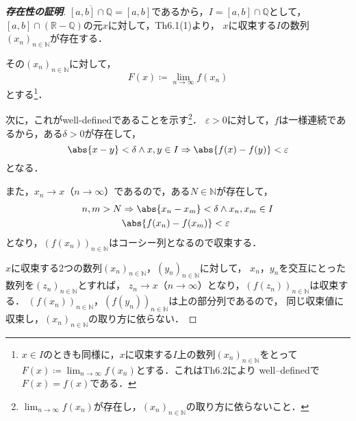 \documentclass[a4paper,10pt,fleqn]{ltjsarticle}
\begin{document}
    \begin{tleftbar}
        \begin{proof}[\textup{\textbf{存在性の証明}}]
            $\overline{[a,b] \cap \mathbb{Q}}=[a,b]$であるから，$I=[a,b] \cap \mathbb{Q}$として，
            $[a,b] \cap (\mathbb{R}-\mathbb{Q})$の元$x$に対して，Th6.1(1)より，
            $x$に収束する$I$の数列$(x_n)_{n \in \mathbb{N}}$が存在する．
            
            その$(x_n)_{n \in \mathbb{N}}$に対して，
            \[
            F(x)\coloneqq \lim_{n \to \infty} f(x_n) 
            \]
            とする\footnote{$x \in I$のときも同様に，$x$に収束する$I$上の数列$(x_n)_{n \in \mathbb{N}}$をとって$F(x)\coloneqq \lim_{n \to \infty} f(x_n)$とする．これはTh6.2により well--definedで$F(x)=f(x)$である．}．
            
            次に，これがwell-definedであることを示す\footnote{$\lim_{n \to \infty} f(x_n)$が存在し，$(x_n)_{n \in \mathbb{N}}$の取り方に依らないこと．}．
            $\varepsilon >0$に対して，$f$は一様連続であるから，ある$\delta >0$が存在して，
            \[
            \abs{x-y}<\delta \land x,y \in I \Rightarrow \abs{f(x)-f(y)}<\varepsilon
            \]
            となる．

            また，$x_n \to x$（$n \to \infty$）であるので，ある$N \in \mathbb{N}$が存在して，
            \begin{align*} 
                n, m > N &\Rightarrow \abs{x_n-x_m}<\delta \land x_n,x_m \in I \\
                & \abs{f(x_n)-f(x_m)}<\varepsilon
            \end{align*}
            となり，$(f(x_n))_{n \in \mathbb{N}}$はコーシー列となるので収束する．

            $x$に収束する2つの数列$(x_n)_{n \in \mathbb{N}}$，$(y_n)_{n \in \mathbb{N}}$に対して，
            $x_n$，$y_n$を交互にとった数列を$(z_n)_{n \in \mathbb{N}}$とすれば，
            $z_n \to x$（$n \to \infty$）となり，$(f(z_n))_{n \in \mathbb{N}}$は収束する．
            $(f(x_n))_{n \in \mathbb{N}}$，$(f(y_n))_{n \in \mathbb{N}}$は上の部分列であるので，
            同じ収束値に収束し，$(x_n)_{n \in \mathbb{N}}$の取り方に依らない．
        \end{proof}
    \end{tleftbar}
\end{document}
